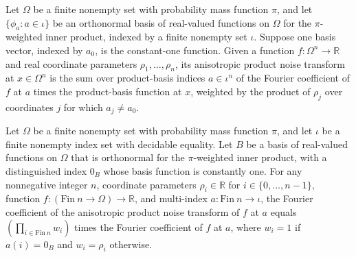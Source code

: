 \begin{definition}
\label{FABL.anisotropicProductNoiseOperator}
\leanok
{}
Let $\Omega$ be a finite nonempty set with probability mass function $\pi$, and let
$\{\phi_a:a\in\iota\}$ be an orthonormal basis of real-valued functions on $\Omega$ for
the $\pi$-weighted inner product, indexed by a finite nonempty set $\iota$. Suppose one
basis vector, indexed by $a_0$, is the constant-one function. Given a function
$f\colon\Omega^n\to\mathbb{R}$ and real coordinate parameters $\rho_1,\ldots,\rho_n$,
its anisotropic product noise transform at $x\in\Omega^n$ is the sum over product-basis
indices $a\in\iota^n$ of the Fourier coefficient of $f$ at $a$ times the product-basis
function at $x$, weighted by the product of $\rho_j$ over coordinates $j$ for which
$a_j\ne a_0$.
\end{definition}

\begin{theorem}
\label{FABL.FiniteFourierBasis.fourierCoeff_anisotropicProductNoiseOperator}
\leanok
{}
Let $\Omega$ be a finite nonempty set with probability mass function $\pi$, and let
$\iota$ be a finite nonempty index set with decidable equality. Let $B$ be a basis of
real-valued functions on $\Omega$ that is orthonormal for the $\pi$-weighted inner
product, with a distinguished index $0_B$ whose basis function is constantly one. For
any nonnegative integer $n$, coordinate parameters $\rho_i\in\mathbb R$ for
$i\in\{0,\ldots,n-1\}$, function $f:(\mathrm{Fin}\ n\to\Omega)\to\mathbb R$, and
multi-index $a:\mathrm{Fin}\ n\to\iota$, the Fourier coefficient of the anisotropic
product noise transform of $f$ at $a$ equals $\left(\prod_{i\in\mathrm{Fin}\ n}
w_i\right)$ times the Fourier coefficient of $f$ at $a$, where $w_i=1$ if $a(i)=0_B$ and
$w_i=\rho_i$ otherwise.
\end{theorem}

